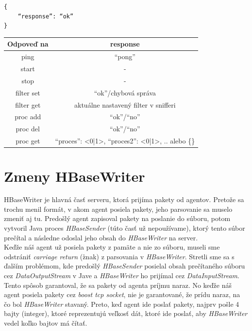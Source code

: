 \documentclass[a4paper,12pt]{article}
\begin{document}
\begin{lstlisting}
{
	“response”: “ok” 
}
\end{lstlisting}


\begin{table}[h!]
	\centering
	\begin{tabular}{|c|c|}
		\hline
		\textbf{Odpoveď na} & \textbf{response}  \\
		\hline
		ping & ``pong'' \\
		\hline
		start & - \\
		\hline
		stop & - \\
		\hline
		filter set &  ``ok''/chybová správa   \\
		\hline
		filter get &  aktuálne nastavený filter v snifferi   \\
		\hline
		proc add &  ``ok''/``no'' \\
		\hline
		proc del &  ``ok''/``no'' \\
		\hline
		proc get &  {“proces”: <0|1>, “proces2”: <0|1>, ..} alebo \{\} \\
		\hline
		
	\end{tabular}
	\label{Tab:1}
\end{table}

\section{Zmeny HBaseWriter} 
HBaseWriter je hlavná časť serveru, ktorá prijíma pakety od agentov. Pretože sa trochu menil formát, v akom agent posiela pakety, jeho parsovanie sa muselo zmeniť aj tu. Predošlý agent zapisoval pakety na poslanie do súboru, potom vytvoril Java proces \textit{HBaseSender} (túto časť už nepoužívame), ktorý tento súbor prečítal a následne odoslal jeho obsah do \textit{HBaseWriter} na server. \\
	
Keďže náš agent už posiela pakety z pamäte a nie zo súboru, museli sme odstrániť \textit{carriage return} (\r znak) z parsovania v \textit{HBaseWriter}. Stretli sme sa s ďalším problémom, kde predošlý \textit{HBaseSender} posielal obsah prečítaného súboru cez \textit{DataOutputStream} v Jave a \textit{HBaseWriter} ho prijímal cez \textit{DataInputStream}. Tento spôsob garantoval, že sa pakety od agenta príjmu naraz. No keďže náš agent posiela pakety cez \textit{boost tcp socket}, nie je garantované, že prídu naraz, na čo bol \textit{HBaseWriter} stavaný. Preto, keď agent ide poslať pakety, najprv pošle 4 bajty (integer), ktoré reprezentujú veľkosť dát, ktoré ide poslať, aby \textit{HBaseWriter} vedel koľko bajtov má čítať. \\
 
\end{document}
